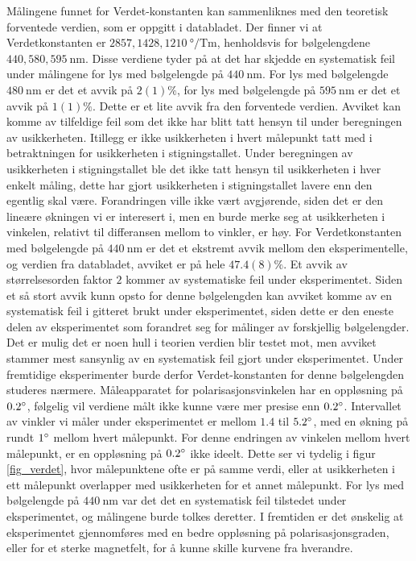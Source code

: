 \documentclass[%
 reprint,
 amsmath,amssymb,
 aps,
 norsk,
]{revtex4-1}
\begin{document}
Målingene funnet for Verdet-konstanten kan sammenliknes med den teoretisk forventede verdien, som er oppgitt i databladet. Der finner vi at Verdetkonstanten er $2857, 1428, \SI{1210}{\degree/\tesla\meter}$, henholdsvis for bølgelengdene $440, 580, \SI{595}{\nano\meter}$. Disse verdiene tyder på at det har skjedde en systematisk feil under målingene for lys med bølgelengde på $\SI{440}{\nano\meter}$. For lys med bølgelengde $\SI{480}{\nano\meter}$ er det et avvik på $2(1)\%$, for lys med bølgelengde på $\SI{595}{\nano\meter}$ er det et avvik på $1(1)\%$. Dette er et lite avvik fra den forventede verdien. Avviket kan komme av tilfeldige feil som det ikke har blitt tatt hensyn til under beregningen av usikkerheten. Itillegg er ikke usikkerheten i hvert målepunkt tatt med i betraktningen for usikkerheten i stigningstallet. Under beregningen av usikkerheten i stigningstallet ble det ikke tatt hensyn til usikkerheten i hver enkelt måling, dette har gjort usikkerheten i stigningstallet lavere enn den egentlig skal være. Forandringen ville ikke vært avgjørende, siden det er den lineære økningen vi er interesert i, men en burde merke seg at usikkerheten i vinkelen, relativt til differansen mellom to vinkler, er høy.
For Verdetkonstanten med bølgelengde på $\SI{440}{\nano\meter}$ er det et ekstremt avvik mellom den eksperimentelle, og verdien fra databladet, avviket er på hele $47.4(8)\%$. Et avvik av størrelsesorden faktor $2$ kommer av systematiske feil under eksperimentet. Siden et så stort avvik kunn opsto for denne bølgelengden kan avviket komme av en systematisk feil i gitteret brukt under eksperimentet, siden dette er den eneste delen av eksperimentet som forandret seg for målinger av forskjellig bølgelengder. Det er mulig det er noen hull i teorien verdien blir testet mot, men avviket stammer mest sansynlig av en systematisk feil gjort under eksperimentet. Under fremtidige eksperimenter burde derfor Verdet-konstanten for denne bølgelengden studeres nærmere.
Måleapparatet for polarisasjonsvinkelen har en oppløsning på $0.2\degree$, følgelig vil verdiene målt ikke kunne være mer presise enn $0.2\degree$. Intervallet av vinkler vi måler under eksperimentet er mellom $1.4$ til $5.2\degree$, med en økning på rundt $1\degree$ mellom hvert målepunkt. For denne endringen av vinkelen mellom hvert målepunkt, er en oppløsning på $0.2\degree$ ikke ideelt. Dette ser vi tydelig i figur \vref{fig_verdet}, hvor målepunktene ofte er på samme verdi, eller at usikkerheten i ett målepunkt overlapper med usikkerheten for et annet målepunkt. For lys med bølgelengde på $\SI{440}{\nano\meter}$ var det det en systematisk feil tilstedet under eksperimentet, og målingene burde tolkes deretter. I fremtiden er det ønskelig at eksperimentet gjennomføres med en bedre oppløsning på polarisasjonsgraden, eller for et sterke magnetfelt, for å kunne skille kurvene fra hverandre.\\
\end{document}
